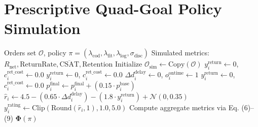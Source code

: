 \documentclass[conference]{IEEEtran}
\begin{document}
\section{Prescriptive Quad-Goal Policy Simulation}

\begin{algorithm}[t]
\caption{ShopSense Quad-Goal Counterfactual Policy Simulation}
\label{alg:simulation}
\begin{algorithmic}[1]
\REQUIRE Orders set $\mathcal{O}$, policy $\pi = (\lambda_{\text{cod}}, \lambda_{\text{fit}}, \lambda_{\text{log}}, \sigma_{\text{disc}})$
\ENSURE Simulated metrics: $R_{\text{net}}, \text{ReturnRate}, \overline{\text{CSAT}}, \text{Retention}$
\STATE Initialize $\mathcal{O}_{\text{sim}} \leftarrow \text{Copy}(\mathcal{O})$
            \STATE $y_i^{\text{return}} \leftarrow 0$, $c_i^{\text{ret\_cost}} \leftarrow 0.0$
        \ENDIF
    \ENDIF
            \STATE $y_i^{\text{return}} \leftarrow 0$, $c_i^{\text{ret\_cost}} \leftarrow 0.0$
        \ENDIF
    \ENDIF
            \STATE $\Delta d_i^{\text{delay}} \leftarrow 0$, $o_i^{\text{ontime}} \leftarrow 1$
                \STATE $y_i^{\text{return}} \leftarrow 0$, $c_i^{\text{ret\_cost}} \leftarrow 0.0$
            \ENDIF
        \ENDIF
    \ENDIF
        \STATE $p_i^{\text{final}} \leftarrow p_i^{\text{final}} + (0.15 \cdot p_i^{\text{base}})$
    \ENDIF
    \STATE $\hat{r}_i \leftarrow 4.5 - (0.65 \cdot \Delta d_i^{\text{delay}}) - (1.8 \cdot y_i^{\text{return}}) + \mathcal{N}(0, 0.35)$
    \STATE $y_i^{\text{rating}} \leftarrow \text{Clip}(\text{Round}(\hat{r}_i, 1), 1.0, 5.0)$
\ENDFOR
\STATE Compute aggregate metrics via Eq. (6)--(9)
\RETURN $\mathbf{\Phi}(\pi)$
\end{algorithmic}
\end{algorithm}
\end{document}
